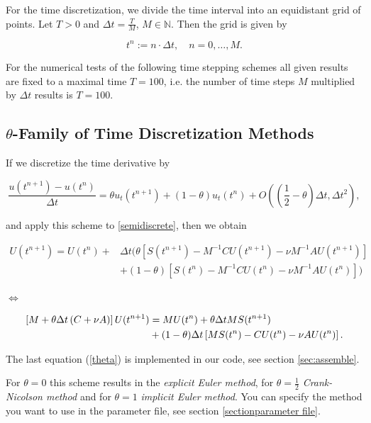 \documentclass[a4paper, 11pt, twoside]{article}
\begin{document}
For the time discretization, we divide the time interval into an equidistant grid of points. Let $T > 0$ and $\Delta t = \frac{T}{M}$, $M \in \mathbb{N}$. Then the grid is given by

	\[t^{n} := n \cdot \Delta t, \quad n = 0, \ldots, M.\]
	
For the numerical tests of the following time stepping schemes all given results are fixed to a maximal time $T = 100$, i.e. the number of time steps  $M$ multiplied by $\Delta t$ results is $T = 100$.

\subsection{$\theta$-Family of Time Discretization Methods}

If we discretize the time derivative by

	\[\frac{u(t^{n+1}) - u(t^{n})}{\Delta t} = \theta u_{t}(t^{n + 1}) + (1 - \theta)u_{t}(t^{n}) + O\left(\left(\frac{1}{2} - \theta\right)\Delta t, \Delta t^{2}\right),\]
	
and apply this scheme to \eqref{semidiscrete}, then we obtain

	\begin{align*}
		U(t^{n+1}) = U(t^{n}) + &\Delta t \Big(\theta [ S(t^{n+1}) - M^{-1}CU(t^{n+1}) - \nu M^{-1}AU(t^{n+1}) ] \\
		&+ (1 - \theta)[S(t^{n}) - M^{-1}CU(t^{n}) - \nu M^{-1}AU(t^{n})]\Big)
	\end{align*}
	
\begin{center}
$\Longleftrightarrow$
\end{center}	

	\begin{align}
		\left[M + \theta\Delta t\left(C + \nu A\right)\right]U(t^{n+1}) &= MU(t^{n}) + \theta\Delta t MS(t^{n+1}) \notag\\
		&+ (1 - \theta)\Delta t \left[MS(t^{n}) - CU(t^{n}) - \nu AU(t^{n})\right]. \label{theta}
	\end{align}
	
The last equation (\ref{theta}) is implemented in our code, see section \ref{sec:assemble}.

For $\theta = 0$ this scheme results in the \emph{explicit Euler method}, for $\theta = \frac{1}{2}$ \emph{Crank-Nicolson method} and for $\theta = 1$ \emph{implicit Euler method}. You can specify the method you want to use in the parameter file, see section \ref{sectionparameter file}.
\end{document}
